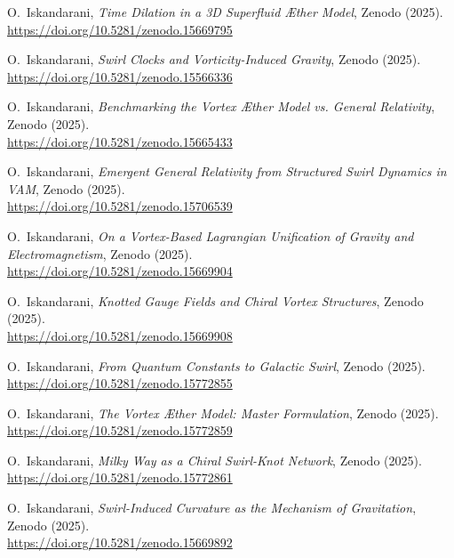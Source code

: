 \documentclass[a4paper,12pt]{article}
\begin{document}
        \begin{thebibliography}{15}

            O.~Iskandarani, \emph{Time Dilation in a 3D Superfluid Æther Model}, Zenodo (2025).\\
            \url{https://doi.org/10.5281/zenodo.15669795}

            O.~Iskandarani, \emph{Swirl Clocks and Vorticity-Induced Gravity}, Zenodo (2025).\\
            \url{https://doi.org/10.5281/zenodo.15566336}

            O.~Iskandarani, \emph{Benchmarking the Vortex Æther Model vs. General Relativity}, Zenodo (2025).\\
            \url{https://doi.org/10.5281/zenodo.15665433}

            O.~Iskandarani, \emph{Emergent General Relativity from Structured Swirl Dynamics in VAM}, Zenodo (2025).\\
            \url{https://doi.org/10.5281/zenodo.15706539}

            O.~Iskandarani, \emph{On a Vortex-Based Lagrangian Unification of Gravity and Electromagnetism}, Zenodo (2025).\\
            \url{https://doi.org/10.5281/zenodo.15669904}

            O.~Iskandarani, \emph{Knotted Gauge Fields and Chiral Vortex Structures}, Zenodo (2025).\\
            \url{https://doi.org/10.5281/zenodo.15669908}

            O.~Iskandarani, \emph{From Quantum Constants to Galactic Swirl}, Zenodo (2025).\\
            \url{https://doi.org/10.5281/zenodo.15772855}

            O.~Iskandarani, \emph{The Vortex Æther Model: Master Formulation}, Zenodo (2025).\\
            \url{https://doi.org/10.5281/zenodo.15772859}

            O.~Iskandarani, \emph{Milky Way as a Chiral Swirl-Knot Network}, Zenodo (2025).\\
            \url{https://doi.org/10.5281/zenodo.15772861}

            O.~Iskandarani, \emph{Swirl-Induced Curvature as the Mechanism of Gravitation}, Zenodo (2025).\\
            \url{https://doi.org/10.5281/zenodo.15669892}


\end{thebibliography}
\end{document}
